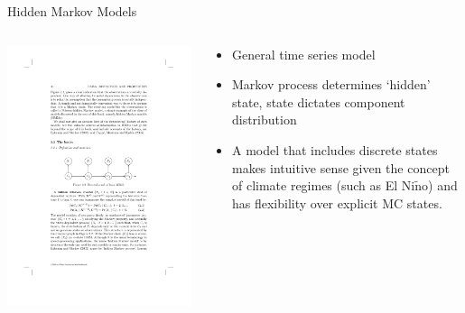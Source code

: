 \documentclass[final,x11names]{beamer}
\begin{document}
\begin{frame}{}
\begin{columns}
\begin{column}{.33\linewidth}
\begin{block}{Hidden Markov Models}
\begin{columns}
\begin{column}{.48\textwidth}
					  \centering
					\includegraphics[width=\textwidth]{figs/hmm-digraph.pdf}

				\end{column}
				\begin{column}{.48\textwidth}
				\begin{itemize}
			    \item General time series model
				\item Markov process determines `hidden' state, state dictates component 
				      distribution
				\item A model that includes discrete states makes intuitive sense given the 
				      concept of climate regimes (such as El Ni$\tilde{\mbox{n}}$o) and has 
				      flexibility over explicit MC states.
			\end{itemize}
				\end{column}
			\end{columns}
			  			

\end{block}
\end{column}
\end{columns}
\end{frame}
\end{document}

